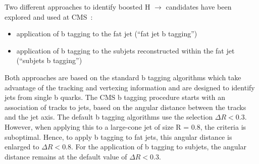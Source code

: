 Two different approaches to identify boosted H $\to$ \bbbar candidates have been explored
and used at CMS~\cite{CMS:BTV13001}:

\begin{itemize}
\item application of b tagging to the fat jet (``fat jet b tagging'')
\item application of b tagging to the subjets reconstructed within the fat jet (``subjets b tagging'')
\end{itemize}

Both approaches are based on the standard b tagging algorithms which take advantage of the tracking and vertexing information and are designed to identify jets from single b quarks.
The CMS b tagging procedure starts with an association of tracks to jets, based on the angular distance between the tracks and the jet axis. 
The default b tagging algorithms use the selection $\Delta R < 0.3$.  However, when applying this to a large-cone jet of size R = 0.8, 
the criteria is suboptimal. Hence, to apply b tagging to fat jets, this angular distance is enlarged to $\Delta R < 0.8$. 
For the application of b tagging to subjets, the angular distance remains at the default value of $\Delta R < 0.3$.\\

